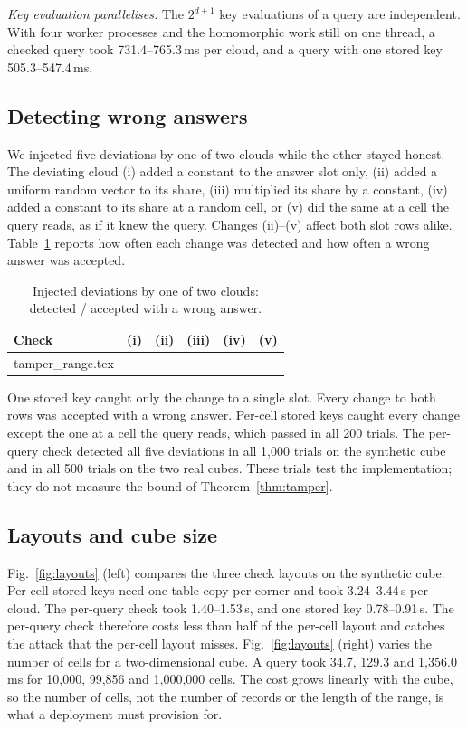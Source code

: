 \documentclass[10pt,journal,compsoc]{IEEEtran}
\begin{document}
\emph{Key evaluation parallelises.} The $2^{d+1}$ key evaluations of a query
are independent. With four worker processes and the homomorphic work still on
one thread, a checked query took 731.4--765.3\,ms per cloud, and a query with
one stored key 505.3--547.4\,ms.

\subsection{Detecting wrong answers}
\label{sec:tampereval}
We injected five deviations by one of two clouds while the other stayed
honest. The deviating cloud (i) added a constant to the answer slot only,
(ii) added a uniform random vector to its share, (iii) multiplied its share by
a constant, (iv) added a constant to its share at a random cell, or (v) did the
same at a cell the query reads, as if it knew the query. Changes (ii)--(v)
affect both slot rows alike. Table~\ref{tab:tamper}
reports how often each change was detected and how often a wrong answer was
accepted.

\begin{table}[t]
\caption{Injected deviations by one of two clouds: detected / accepted with a
wrong answer.}
\label{tab:tamper}
\centering
\footnotesize
\setlength{\tabcolsep}{2.5pt}
\begin{tabular}{@{}lccccc@{}}
\toprule
Check & (i) & (ii) & (iii) & (iv) & (v) \\
\midrule
{} tamper_range.tex
\bottomrule
\end{tabular}
\end{table}

One stored key caught only the change to a single slot. Every change to both
rows was accepted with a wrong answer. Per-cell stored keys caught every
change except the one at a cell the query reads, which passed in all 200
trials. The
per-query check detected all five deviations in all 1,000 trials on the
synthetic cube and in all 500 trials on the two real cubes. These trials test
the implementation; they do not measure the bound of
Theorem~\ref{thm:tamper}.

\subsection{Layouts and cube size}
\label{sec:layouts}
Fig.~\ref{fig:layouts} (left) compares the three check layouts on the
synthetic cube. Per-cell stored keys need one table copy per corner and took
3.24--3.44\,s per cloud. The per-query check took 1.40--1.53\,s, and one stored
key 0.78--0.91\,s. The per-query check therefore costs less than half of the
per-cell layout and catches the attack that the per-cell layout misses.
Fig.~\ref{fig:layouts} (right) varies the number of cells for a
two-dimensional cube. A query took 34.7, 129.3 and 1,356.0\,ms for 10,000,
99,856 and 1,000,000 cells. The cost grows linearly with the cube, so the
number of cells, not the number of records or the length of the range, is what
a deployment must provision for.
\end{document}
